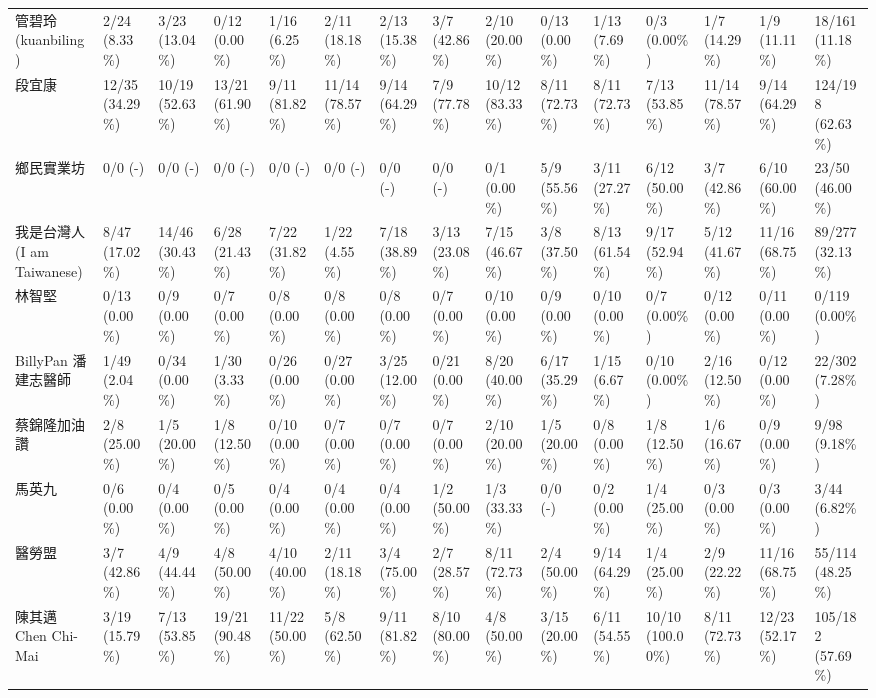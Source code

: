 \documentclass[letterpaper, 10pt, conference]{ieeeconf}   %
\begin{document}
\begin{CJK}{UTF8}{bsmi}
\begin{landscape}
\begin{longtable}[c]{@{}L{2.45cm}L{1.1cm}L{1.1cm}L{1.1cm}L{1.1cm}L{1.1cm}L{1.1cm}L{1.1cm}L{1.1cm}L{1.1cm}L{1.1cm}L{1.1cm}L{1.1cm}L{1.1cm}L{1.1cm}@{}}
管碧玲 (kuanbiling) & 2/24 (8.33\%) & 3/23 (13.04\%) & 0/12 (0.00\%) & 1/16 (6.25\%) & 2/11 (18.18\%) & 2/13 (15.38\%) & 3/7 (42.86\%) & 2/10 (20.00\%) & 0/13 (0.00\%) & 1/13 (7.69\%) & 0/3 (0.00\%) & 1/7 (14.29\%) & 1/9 (11.11\%) & 18/161 (11.18\%) \\
段宜康 & 12/35 (34.29\%) & 10/19 (52.63\%) & 13/21 (61.90\%) & 9/11 (81.82\%) & 11/14 (78.57\%) & 9/14 (64.29\%) & 7/9 (77.78\%) & 10/12 (83.33\%) & 8/11 (72.73\%) & 8/11 (72.73\%) & 7/13 (53.85\%) & 11/14 (78.57\%) & 9/14 (64.29\%) & 124/198 (62.63\%) \\
鄉民實業坊 & 0/0 (-) & 0/0 (-) & 0/0 (-) & 0/0 (-) & 0/0 (-) & 0/0 (-) & 0/0 (-) & 0/1 (0.00\%) & 5/9 (55.56\%) & 3/11 (27.27\%) & 6/12 (50.00\%) & 3/7 (42.86\%) & 6/10 (60.00\%) & 23/50 (46.00\%) \\
我是台灣人 (I am Taiwanese) & 8/47 (17.02\%) & 14/46 (30.43\%) & 6/28 (21.43\%) & 7/22 (31.82\%) & 1/22 (4.55\%) & 7/18 (38.89\%) & 3/13 (23.08\%) & 7/15 (46.67\%) & 3/8 (37.50\%) & 8/13 (61.54\%) & 9/17 (52.94\%) & 5/12 (41.67\%) & 11/16 (68.75\%) & 89/277 (32.13\%) \\
林智堅 & 0/13 (0.00\%) & 0/9 (0.00\%) & 0/7 (0.00\%) & 0/8 (0.00\%) & 0/8 (0.00\%) & 0/8 (0.00\%) & 0/7 (0.00\%) & 0/10 (0.00\%) & 0/9 (0.00\%) & 0/10 (0.00\%) & 0/7 (0.00\%) & 0/12 (0.00\%) & 0/11 (0.00\%) & 0/119 (0.00\%) \\
BillyPan 潘建志醫師 & 1/49 (2.04\%) & 0/34 (0.00\%) & 1/30 (3.33\%) & 0/26 (0.00\%) & 0/27 (0.00\%) & 3/25 (12.00\%) & 0/21 (0.00\%) & 8/20 (40.00\%) & 6/17 (35.29\%) & 1/15 (6.67\%) & 0/10 (0.00\%) & 2/16 (12.50\%) & 0/12 (0.00\%) & 22/302 (7.28\%) \\
蔡錦隆加油讚 & 2/8 (25.00\%) & 1/5 (20.00\%) & 1/8 (12.50\%) & 0/10 (0.00\%) & 0/7 (0.00\%) & 0/7 (0.00\%) & 0/7 (0.00\%) & 2/10 (20.00\%) & 1/5 (20.00\%) & 0/8 (0.00\%) & 1/8 (12.50\%) & 1/6 (16.67\%) & 0/9 (0.00\%) & 9/98 (9.18\%) \\
馬英九 & 0/6 (0.00\%) & 0/4 (0.00\%) & 0/5 (0.00\%) & 0/4 (0.00\%) & 0/4 (0.00\%) & 0/4 (0.00\%) & 1/2 (50.00\%) & 1/3 (33.33\%) & 0/0 (-) & 0/2 (0.00\%) & 1/4 (25.00\%) & 0/3 (0.00\%) & 0/3 (0.00\%) & 3/44 (6.82\%) \\
醫勞盟 & 3/7 (42.86\%) & 4/9 (44.44\%) & 4/8 (50.00\%) & 4/10 (40.00\%) & 2/11 (18.18\%) & 3/4 (75.00\%) & 2/7 (28.57\%) & 8/11 (72.73\%) & 2/4 (50.00\%) & 9/14 (64.29\%) & 1/4 (25.00\%) & 2/9 (22.22\%) & 11/16 (68.75\%) & 55/114 (48.25\%) \\
陳其邁 Chen Chi-Mai & 3/19 (15.79\%) & 7/13 (53.85\%) & 19/21 (90.48\%) & 11/22 (50.00\%) & 5/8 (62.50\%) & 9/11 (81.82\%) & 8/10 (80.00\%) & 4/8 (50.00\%) & 3/15 (20.00\%) & 6/11 (54.55\%) & 10/10 (100.00\%) & 8/11 (72.73\%) & 12/23 (52.17\%) & 105/182 (57.69\%) \\

\end{longtable}
\end{landscape}
\end{CJK}
\end{document}
